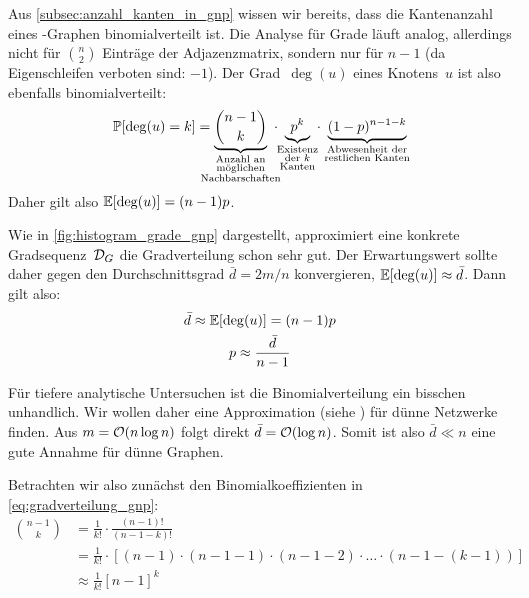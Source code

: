 Aus \cref{subsec:anzahl_kanten_in_gnp} wissen wir bereits, dass die Kantenanzahl eines \Gnp-Graphen binomialverteilt ist.
Die Analyse für Grade läuft analog, allerdings nicht für $\binom n 2$ Einträge der Adjazenzmatrix, sondern nur für $n-1$ (da Eigenschleifen verboten sind: $-1$).
Der Grad~$\deg(u)$ eines Knotens~$u$ ist also ebenfalls binomialverteilt:
\begin{equation}
    \prob{\deg(u) = k} =
    \underbrace{\binom{n-1}{k}}_{\mathclap{\substack{\text{Anzahl an} \\ \text{möglichen} \\ \text{Nachbarschaften}}}}
    \ \cdot \ %
    \underbrace{p^k\mathstrut}_{\mathclap{\substack{\text{Existenz} \\ \text{der $k$} \\ \text{Kanten}}}}
    \ \cdot \ %
    \underbrace{(1-p)^{n-1-k}}_{\mathclap{\substack{\text{Abwesenheit der} \\ \text{restlichen Kanten}}}}
    \label{eq:gradverteilung_gnp}
\end{equation}
Daher gilt also $\mathbb{E}\!\left[\deg(u)\right] = (n-1)p$.

Wie in \cref{fig:histogram_grade_gnp} dargestellt, approximiert eine konkrete Gradsequenz~$\mathcal{D}_G$ die Gradverteilung schon sehr gut.
Der Erwartungswert sollte daher gegen den Durchschnittsgrad $\bar d = 2m / n$ konvergieren, \dh $\mathbb{E}\!\left[\deg(u)\right] \approx \bar d$.
Dann gilt also:
\begin{gather}
    \bar d \approx \mathbb{E}\!\left[\deg(u)\right] = (n-1)p \\
    p \approx \frac{\bar d}{n-1} \label{eq:gnp_p_von_avg_deg}
\end{gather}

Für tiefere analytische Untersuchen ist die Binomialverteilung ein bisschen unhandlich.
Wir wollen daher eine Approximation (siehe \cite{barabasi2014network}) für dünne Netzwerke finden.
Aus $m = \mathcal{O}\!\left(n \log n\right)$ folgt direkt $\bar d = \mathcal{O}\!\left(\log n\right)$.
Somit ist also $\bar d \ll n$ eine gute Annahme für dünne Graphen.

\medskip

Betrachten wir also zunächst den Binomialkoeffizienten in \cref{eq:gradverteilung_gnp}:
\begin{align}
    \binom{n-1}{k}
     & = \frac{1}{k!} \cdot \frac{(n-1)!}{(n-1-k)!}                                                              \\
     & = \frac{1}{k!} \cdot \left[ (n-1) \cdot (n-1-1) \cdot (n-1-2) \cdot \ldots \cdot (n-1-(k - 1))    \right] \\
     & \approx \frac{1}{k!} \left[ n- 1 \right]^k
\end{align}

